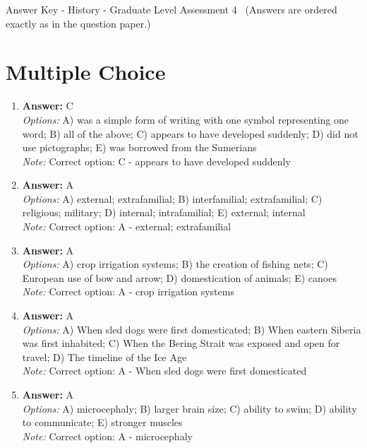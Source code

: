 \documentclass[12pt]{article}
\begin{document}
\begin{center}
Answer Key - History - Graduate Level Assessment 4 \
\small (Answers are ordered exactly as in the question paper.)
\end{center}

\section*{Multiple Choice}
\begin{enumerate}[label=\arabic*.]
\item \textbf{Answer:} C
\\ \textit{Options:} A) was a simple form of writing with one symbol representing one word; B) all of the above; C) appears to have developed suddenly; D) did not use pictographs; E) was borrowed from the Sumerians
\\ \textit{Note:} Correct option: C - appears to have developed suddenly
\item \textbf{Answer:} A
\\ \textit{Options:} A) external; extrafamilial; B) interfamilial; extrafamilial; C) religious; military; D) internal; intrafamilial; E) external; internal
\\ \textit{Note:} Correct option: A - external; extrafamilial
\item \textbf{Answer:} A
\\ \textit{Options:} A) crop irrigation systems; B) the creation of fishing nets; C) European use of bow and arrow; D) domestication of animals; E) canoes
\\ \textit{Note:} Correct option: A - crop irrigation systems
\item \textbf{Answer:} A
\\ \textit{Options:} A) When sled dogs were first domesticated; B) When eastern Siberia was first inhabited; C) When the Bering Strait was exposed and open for travel; D) The timeline of the Ice Age
\\ \textit{Note:} Correct option: A - When sled dogs were first domesticated
\item \textbf{Answer:} A
\\ \textit{Options:} A) microcephaly; B) larger brain size; C) ability to swim; D) ability to communicate; E) stronger muscles
\\ \textit{Note:} Correct option: A - microcephaly
\end{enumerate}
\end{document}
